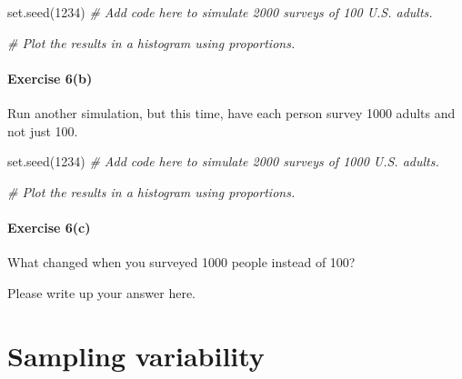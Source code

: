 \documentclass[
]{book}
\newenvironment{Shaded}{\begin{snugshade}}{\end{snugshade}}
\newcommand{\CommentTok}[1]{\textcolor[rgb]{0.56,0.35,0.01}{\textit{#1}}}
\newcommand{\DecValTok}[1]{\textcolor[rgb]{0.00,0.00,0.81}{#1}}
\newcommand{\FunctionTok}[1]{\textcolor[rgb]{0.00,0.00,0.00}{#1}}
\newcommand{\NormalTok}[1]{#1}
\begin{document}
\begin{Shaded}
\begin{Highlighting}[]
\FunctionTok{set.seed}\NormalTok{(}\DecValTok{1234}\NormalTok{)}
\CommentTok{\# Add code here to simulate 2000 surveys of 100 U.S. adults.}
\end{Highlighting}
\end{Shaded}

\begin{Shaded}
\begin{Highlighting}[]
\CommentTok{\# Plot the results in a histogram using proportions.}
\end{Highlighting}
\end{Shaded}

\hypertarget{exercise-6b-2}{%
\paragraph*{Exercise 6(b)}\label{exercise-6b-2}}

Run another simulation, but this time, have each person survey 1000 adults and not just 100.

\begin{Shaded}
\begin{Highlighting}[]
\FunctionTok{set.seed}\NormalTok{(}\DecValTok{1234}\NormalTok{)}
\CommentTok{\# Add code here to simulate 2000 surveys of 1000 U.S. adults.}
\end{Highlighting}
\end{Shaded}

\begin{Shaded}
\begin{Highlighting}[]
\CommentTok{\# Plot the results in a histogram using proportions.}
\end{Highlighting}
\end{Shaded}

\hypertarget{exercise-6c}{%
\paragraph*{Exercise 6(c)}\label{exercise-6c}}

What changed when you surveyed 1000 people instead of 100?

Please write up your answer here.

\hypertarget{randomization1-sampling-var}{%
\section{Sampling variability}\label{randomization1-sampling-var}}
\end{document}
